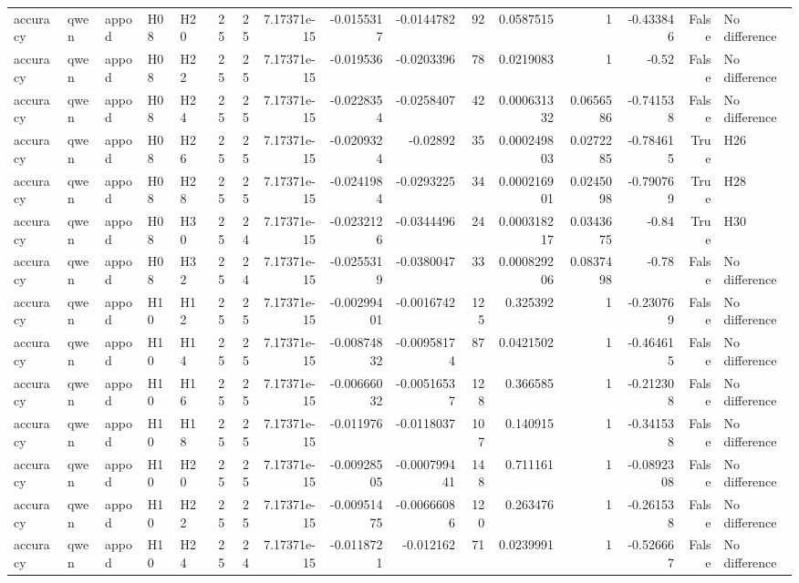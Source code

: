 \begin{longtable}{lllllrrrrrrrrrrl}
accuracy & qwen & appod & H08 & H20 & 25 & 25 & 7.17371e-15 & -0.0155317 & -0.0144782 & 92 & 0.0587515 & 1 & -0.433846 & False & No difference \\
accuracy & qwen & appod & H08 & H22 & 25 & 25 & 7.17371e-15 & -0.019536 & -0.0203396 & 78 & 0.0219083 & 1 & -0.52 & False & No difference \\
accuracy & qwen & appod & H08 & H24 & 25 & 25 & 7.17371e-15 & -0.0228354 & -0.0258407 & 42 & 0.000631332 & 0.0656586 & -0.741538 & False & No difference \\
accuracy & qwen & appod & H08 & H26 & 25 & 25 & 7.17371e-15 & -0.0209324 & -0.02892 & 35 & 0.000249803 & 0.0272285 & -0.784615 & True & H26 \\
accuracy & qwen & appod & H08 & H28 & 25 & 25 & 7.17371e-15 & -0.0241984 & -0.0293225 & 34 & 0.000216901 & 0.0245098 & -0.790769 & True & H28 \\
accuracy & qwen & appod & H08 & H30 & 25 & 24 & 7.17371e-15 & -0.0232126 & -0.0344496 & 24 & 0.000318217 & 0.0343675 & -0.84 & True & H30 \\
accuracy & qwen & appod & H08 & H32 & 25 & 24 & 7.17371e-15 & -0.0255319 & -0.0380047 & 33 & 0.000829206 & 0.0837498 & -0.78 & False & No difference \\
accuracy & qwen & appod & H10 & H12 & 25 & 25 & 7.17371e-15 & -0.00299401 & -0.0016742 & 125 & 0.325392 & 1 & -0.230769 & False & No difference \\
accuracy & qwen & appod & H10 & H14 & 25 & 25 & 7.17371e-15 & -0.00874832 & -0.00958174 & 87 & 0.0421502 & 1 & -0.464615 & False & No difference \\
accuracy & qwen & appod & H10 & H16 & 25 & 25 & 7.17371e-15 & -0.00666032 & -0.00516537 & 128 & 0.366585 & 1 & -0.212308 & False & No difference \\
accuracy & qwen & appod & H10 & H18 & 25 & 25 & 7.17371e-15 & -0.011976 & -0.0118037 & 107 & 0.140915 & 1 & -0.341538 & False & No difference \\
accuracy & qwen & appod & H10 & H20 & 25 & 25 & 7.17371e-15 & -0.00928505 & -0.000799441 & 148 & 0.711161 & 1 & -0.0892308 & False & No difference \\
accuracy & qwen & appod & H10 & H22 & 25 & 25 & 7.17371e-15 & -0.00951475 & -0.00666086 & 120 & 0.263476 & 1 & -0.261538 & False & No difference \\
accuracy & qwen & appod & H10 & H24 & 25 & 24 & 7.17371e-15 & -0.0118721 & -0.012162 & 71 & 0.0239991 & 1 & -0.526667 & False & No difference \\

\end{longtable}
